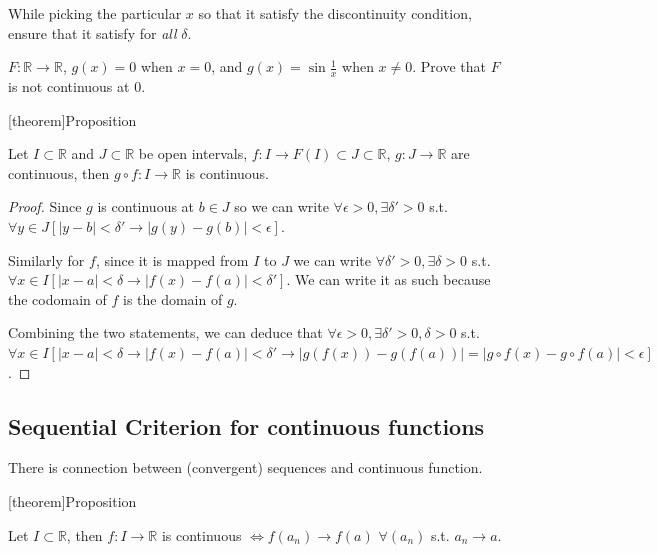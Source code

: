 \documentclass[12pt]{report}
\theoremstyle{definition}
\begin{document}
While picking the particular $x$ so that it satisfy the discontinuity condition,
ensure that it satisfy for \emph{all} $\delta$.
\begin{ex}
    $F:\mathbb{R}\rightarrow{}\mathbb{R}$,
    $g(x)=0$ when $x=0$, and $g(x) = \sin{\frac{1}{x}}$ when $x\neq 0$.
    Prove that $F$ is not continuous at 0.
\end{ex}

[theorem]{Proposition}
\begin{continiuos function composition is continuous}
    Let $I \subset \mathbb{R}$ and $J \subset \mathbb{R}$ be open intervals,
    $f:I\rightarrow{}F(I)\subset J \subset\mathbb{R}$, 
    $g:J\rightarrow{}\mathbb{R}$ are continuous,
    then $g\circ f:I\rightarrow{}\mathbb{R}$ is continuous.
\end{continiuos function composition is continuous}

\begin{proof}
    Since $g$ is continuous at $b \in J$ so we can write
    $\forall \epsilon > 0, \exists \delta' > 0$ s.t.
    $\forall y \in J [|y-b|<\delta' \rightarrow |g(y)-g(b)|<\epsilon]$.

    Similarly for $f$, since it is mapped from $I$ to $J$ we can write
    $\forall \delta' > 0, \exists \delta > 0$ s.t. 
    $\forall x \in I [|x-a|<\delta \rightarrow |f(x)-f(a)|<\delta']$.
    We can write it as such because the codomain of $f$ is the domain of $g$.

    Combining the two statements, we can deduce that
    $\forall \epsilon > 0, \exists \delta' > 0, \delta > 0$ s.t.
    $\forall x \in I [|x-a|<\delta \rightarrow |f(x)-f(a)|<\delta' 
    \rightarrow |g(f(x))-g(f(a))|=|g\circ f(x) - g\circ f(a)|<\epsilon]$.
\end{proof} 

\subsection{Sequential Criterion for continuous functions}

There is connection between (convergent) sequences and continuous function.

[theorem]{Proposition}
\begin{continuous function and sequences}
    Let $I\subset \mathbb{R}$, then $f:I\rightarrow{}\mathbb{R}$ is continuous
    $\iff f(a_n) \rightarrow{} f(a)$ $\forall (a_n)$ s.t. $a_n \rightarrow{}a$.
\end{continuous function and sequences}
\end{document}
